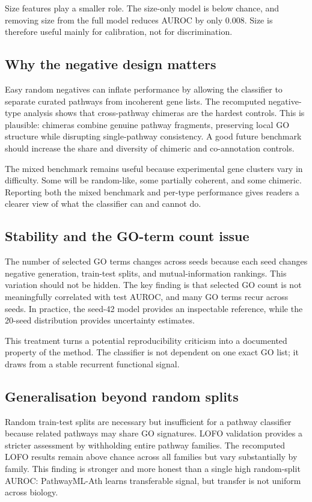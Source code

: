 \documentclass[11pt]{article}
\begin{document}
Size features play a smaller role. The size-only model is below chance, and removing size from the full model reduces AUROC by only 0.008. Size is therefore useful mainly for calibration, not for discrimination.

\subsection{Why the negative design matters}
Easy random negatives can inflate performance by allowing the classifier to separate curated pathways from incoherent gene lists. The recomputed negative-type analysis shows that cross-pathway chimeras are the hardest controls. This is plausible: chimeras combine genuine pathway fragments, preserving local GO structure while disrupting single-pathway consistency. A good future benchmark should increase the share and diversity of chimeric and co-annotation controls.

The mixed benchmark remains useful because experimental gene clusters vary in difficulty. Some will be random-like, some partially coherent, and some chimeric. Reporting both the mixed benchmark and per-type performance gives readers a clearer view of what the classifier can and cannot do.

\subsection{Stability and the GO-term count issue}
The number of selected GO terms changes across seeds because each seed changes negative generation, train-test splits, and mutual-information rankings. This variation should not be hidden. The key finding is that selected GO count is not meaningfully correlated with test AUROC, and many GO terms recur across seeds. In practice, the seed-42 model provides an inspectable reference, while the 20-seed distribution provides uncertainty estimates.

This treatment turns a potential reproducibility criticism into a documented property of the method. The classifier is not dependent on one exact GO list; it draws from a stable recurrent functional signal.

\subsection{Generalisation beyond random splits}
Random train-test splits are necessary but insufficient for a pathway classifier because related pathways may share GO signatures. LOFO validation provides a stricter assessment by withholding entire pathway families. The recomputed LOFO results remain above chance across all families but vary substantially by family. This finding is stronger and more honest than a single high random-split AUROC: PathwayML-Ath learns transferable signal, but transfer is not uniform across biology.
\end{document}
